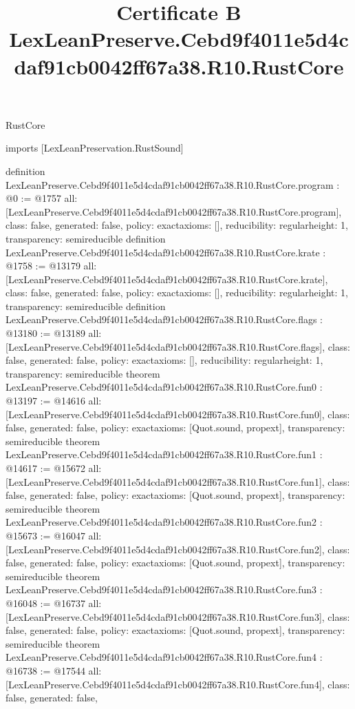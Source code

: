\begin{lexlean}{RustCore}
\title{Certificate B LexLeanPreserve.Cebd9f4011e5d4cdaf91cb0042ff67a38.R10.RustCore}
\begin{coremodule}
imports [LexLeanPreservation.RustSound]

definition LexLeanPreserve.Cebd9f4011e5d4cdaf91cb0042ff67a38.R10.RustCore.program : @0 := @1757 {
  all: [LexLeanPreserve.Cebd9f4011e5d4cdaf91cb0042ff67a38.R10.RustCore.program],
  class: false,
  generated: false,
  policy: exact{axioms: []},
  reducibility: regular{height: 1},
  transparency: semireducible
}
definition LexLeanPreserve.Cebd9f4011e5d4cdaf91cb0042ff67a38.R10.RustCore.krate : @1758 := @13179 {
  all: [LexLeanPreserve.Cebd9f4011e5d4cdaf91cb0042ff67a38.R10.RustCore.krate],
  class: false,
  generated: false,
  policy: exact{axioms: []},
  reducibility: regular{height: 1},
  transparency: semireducible
}
definition LexLeanPreserve.Cebd9f4011e5d4cdaf91cb0042ff67a38.R10.RustCore.flags : @13180 := @13189 {
  all: [LexLeanPreserve.Cebd9f4011e5d4cdaf91cb0042ff67a38.R10.RustCore.flags],
  class: false,
  generated: false,
  policy: exact{axioms: []},
  reducibility: regular{height: 1},
  transparency: semireducible
}
theorem LexLeanPreserve.Cebd9f4011e5d4cdaf91cb0042ff67a38.R10.RustCore.fun0 : @13197 := @14616 {
  all: [LexLeanPreserve.Cebd9f4011e5d4cdaf91cb0042ff67a38.R10.RustCore.fun0],
  class: false,
  generated: false,
  policy: exact{axioms: [Quot.sound, propext]},
  transparency: semireducible
}
theorem LexLeanPreserve.Cebd9f4011e5d4cdaf91cb0042ff67a38.R10.RustCore.fun1 : @14617 := @15672 {
  all: [LexLeanPreserve.Cebd9f4011e5d4cdaf91cb0042ff67a38.R10.RustCore.fun1],
  class: false,
  generated: false,
  policy: exact{axioms: [Quot.sound, propext]},
  transparency: semireducible
}
theorem LexLeanPreserve.Cebd9f4011e5d4cdaf91cb0042ff67a38.R10.RustCore.fun2 : @15673 := @16047 {
  all: [LexLeanPreserve.Cebd9f4011e5d4cdaf91cb0042ff67a38.R10.RustCore.fun2],
  class: false,
  generated: false,
  policy: exact{axioms: [Quot.sound, propext]},
  transparency: semireducible
}
theorem LexLeanPreserve.Cebd9f4011e5d4cdaf91cb0042ff67a38.R10.RustCore.fun3 : @16048 := @16737 {
  all: [LexLeanPreserve.Cebd9f4011e5d4cdaf91cb0042ff67a38.R10.RustCore.fun3],
  class: false,
  generated: false,
  policy: exact{axioms: [Quot.sound, propext]},
  transparency: semireducible
}
theorem LexLeanPreserve.Cebd9f4011e5d4cdaf91cb0042ff67a38.R10.RustCore.fun4 : @16738 := @17544 {
  all: [LexLeanPreserve.Cebd9f4011e5d4cdaf91cb0042ff67a38.R10.RustCore.fun4],
  class: false,
  generated: false,
}
\end{coremodule}
\end{lexlean}
